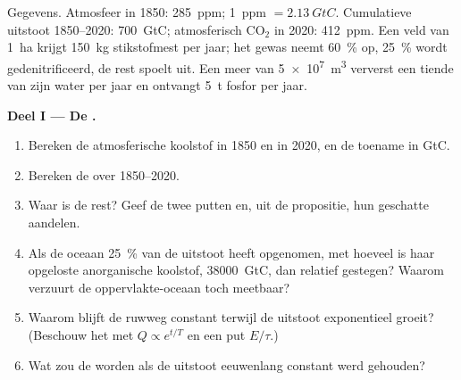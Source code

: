 \begin{problem}
\label{pb:b2:biogeochemical-cycles:1}
Gegevens. Atmosfeer in 1850: \qty{285}{ppm}; \qty{1}{ppm} $=
\qty{2.13}{GtC}$. Cumulatieve uitstoot 1850--2020: \qty{700}{GtC};
atmosferisch $\mathrm{CO_2}$ in 2020: \qty{412}{ppm}. Een veld van
\qty{1}{ha} krijgt \qty{150}{kg} stikstofmest per jaar;
het gewas neemt \qty{60}{\%} op, \qty{25}{\%} wordt gedenitrificeerd, de
rest spoelt uit. Een meer van \qty{5e7}{m^3} ververst een tiende van zijn water
per jaar en ontvangt \qty{5}{t} fosfor per jaar.

\medskip
\noindent\textbf{Deel I --- De .}
\begin{enumerate}
  \item Bereken de atmosferische koolstof in 1850 en in 2020, en de
        toename in GtC.
  \item Bereken de  over 1850--2020.
  \item Waar is de rest? Geef de twee putten en, uit de
        propositie, hun geschatte aandelen.
  \item Als de oceaan \qty{25}{\%} van de uitstoot heeft opgenomen, met hoeveel
        is haar opgeloste anorganische koolstof, \qty{38000}{GtC}, dan relatief
        gestegen? Waarom verzuurt de oppervlakte-oceaan toch meetbaar?
  \item Waarom blijft de  ruwweg constant terwijl de
        uitstoot exponentieel groeit? (Beschouw het  met
        $Q \propto e^{t/T}$ en een put $E/\tau$.)
  \item Wat zou de  worden als de uitstoot eeuwenlang
        constant werd gehouden?
\end{enumerate}


\end{problem}
